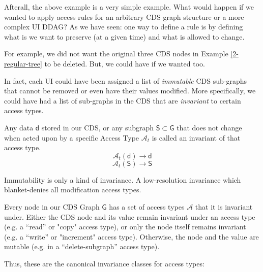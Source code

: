 Afterall, the above example is a very simple example. What would happen if we wanted to apply access rules for an arbitrary CDS graph structure or a more complex UI DDAG? As we have seen: one way to define a rule is by defining what is we want to preserve (at a given time) and what is allowed to change.

For example, we did not want the original three CDS nodes in Example \ref{2-regular-tree} to be deleted. But, we could have if we wanted too.

In fact, each UI could have been assigned a list of \textit{immutable} CDS sub-graphs that cannot be removed or even have their values modified. More specifically, we could have had a list of sub-graphs in the CDS that are \textit{invariant} to certain access types.

\begin{con-def}[Invariants]
	\label{invariants}
	Any data $\mathsf{d}$ stored in our CDS, or any subgraph $\mathsf{S} \subset \mathsf{G}$ that does not change when acted upon by a specific Access Type $\mathcal{A}_{t}$ is called an invariant of that access type.
	\[ \mathcal{A}_{t}\mathsf{(d)} \rightarrow \mathsf{d} \]
	\[ \mathcal{A}_{t}\mathsf{(S)} \rightarrow \mathsf{S} \]
\end{con-def}

\begin{con-aside}
Immutability is only a kind of invariance. A low-resolution invariance which blanket-denies all modification access types.
\end{con-aside}

Every node in our CDS Graph $\mathsf{G}$ has a set of access types $\mathcal{A}$ that it is invariant under. Either the CDS node and its value remain invariant under an access type (e.g. a ``read'' or "copy" access type), or only the node itself remains invariant (e.g. a ``write'' or "increment" access type). Otherwise, the node and the value are mutable (e.g. in a ``delete-subgraph'' access type).

Thus, these are the canonical invariance classes for access types:

\noindent{}

